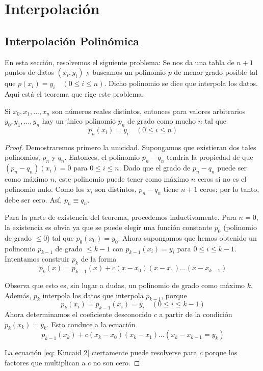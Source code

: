 \chapter{Interpolación}
\section{Interpolación Polinómica}
En esta sección, resolvemos el siguiente problema: Se nos da una tabla de $n + 1$ puntos de datos $(x_i, y_i)$ y buscamos un polinomio $p$ de menor grado posible tal que $p(x_i) = y_i \quad (0 \leq i \leq n)$. Dicho polinomio se dice que interpola los datos. Aquí está el teorema que rige este problema.

\begin{theorem}
Si $x_0, x_1,..., x_n$ son números reales distintos, entonces para valores arbitrarios $y_0, y_1,..., y_n$ hay un único polinomio $p_n$ de grado como mucho $n$ tal que
\[ p_n(x_i) = y_i \quad (0 \leq i \leq n) \]
\end{theorem}

\begin{proof}
Demostraremos primero la unicidad. Supongamos que existieran dos tales polinomios, \( p_n \) y \( q_n \). Entonces, el polinomio \( p_n - q_n \) tendría la propiedad de que \( (p_n - q_n)(x_i) = 0 \) para \( 0 \leq i \leq n \). Dado que el grado de \( p_n - q_n \) puede ser como máximo \( n \), este polinomio puede tener como máximo \( n \) ceros si no es el polinomio nulo. Como los \( x_i \) son distintos, \( p_n - q_n \) tiene \( n + 1 \) ceros; por lo tanto, debe ser cero. Así, \( p_n \equiv q_n \).    

Para la parte de existencia del teorema, procedemos inductivamente. Para \( n = 0 \), la existencia es obvia ya que se puede elegir una función constante \( p_0 \) (polinomio de grado \( \leq 0 \)) tal que \( p_0(x_0) = y_0 \). Ahora supongamos que hemos obtenido un polinomio \( p_{k-1} \) de grado \( \leq k - 1 \) con \( p_{k-1}(x_i) = y_i \) para \( 0 \leq i \leq k - 1 \). Intentamos construir \( p_k \) de la forma
\begin{equation}
    \label{eq: Kincaid 1}
    p_k (x) = p_{k - 1} (x) + c (x - x_0) (x - x_1) ... (x-x_{k - 1})
\end{equation}

Observa que esto es, sin lugar a dudas, un polinomio de grado como máximo \( k \). Además, \( p_k \) interpola los datos que interpola \( p_{k-1} \), porque
\[ p_k(x_i) = p_{k - 1} (x_i) = y_i \quad (0 \leq i \leq k -1)\]
Ahora determinamos el coeficiente desconocido \( c \) a partir de la condición \( p_k(x_k) = y_k \). Esto conduce a la ecuación
\begin{equation}
    \label{eq: Kincaid 2}
    p_{k - 1}(x_k) + c(x_k - x_0) (x_k - x_1)...(x_k - x_{k - 1} = y_k)
\end{equation}

La ecuación \ref{eq: Kincaid 2} ciertamente puede resolverse para \( c \) porque los factores que multiplican a \( c \) no son cero.

\end{proof}

